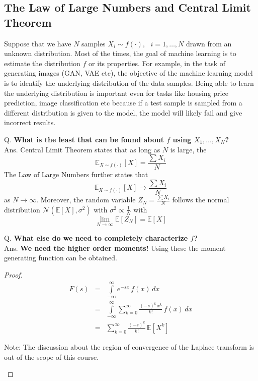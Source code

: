 \documentclass[11pt, twosides]{article}
\begin{document}
\subsection{The Law of Large Numbers and Central Limit Theorem}
Suppose that we have $N$ samples $X_i \sim f(\cdot), \:\:\: i = 1, \hdots, N$ drawn from an unknown distribution. Most of the times, the goal of machine learning is to estimate the distribution $f$ or its properties. For example, in the task of generating images (GAN, VAE etc), the objective of the machine learning model is to identify the underlying distribution of the data samples. Being able to learn the underlying distribution is important even for tasks like housing price prediction, image classification etc because if a test sample is sampled from a different distribution is given to the model, the model will likely fail and give incorrect results. 
\begin{flushleft}
Q. \textbf{What is the least that can be found about $f$ using $X_1, \hdots, X_N$?}\\

Ans. \color{blue} Central Limit Theorem states that as long as $N$ is large, the $$\mathbb{E}_{X \sim f(\cdot)}[X] = \frac{\sum X_i}{N}$$
The Law of Large Numbers further states that
$$\mathbb{E}_{X \sim f(\cdot)}[X] \xrightarrow{}\frac{\sum X_i}{N}$$
as $N \xrightarrow{} \infty$. Moreover, the random variable $Z_N = \frac{\sum X_i}{N}$ follows the normal distribution $\mathcal{N}(\mathbb{E}[X], \sigma^2)$
with $\sigma^2 \propto \frac{1}{N}$ with
$$\lim \limits_{N \xrightarrow{}\infty}\mathbb{E}[Z_N] = \mathbb{E}[X]$$
\end{flushleft}
\begin{flushleft}
Q. \textbf{What else do we need to completely characterize $f$?}\\

Ans. \color{blue} \textbf{We need the higher order moments!} Using these the moment generating function can be obtained.
\end{flushleft}


\begin{proof}
\begin{eqnarray*}
F(s) &=& \int \limits_{-\infty}^\infty e^{-sx}\, f(x)\, dx\\
&=& \int \limits_{-\infty}^\infty \sum \limits_{k = 0}^{\infty} \frac{(-s)^k\, x^k}{k!}\, f(x)\, dx\\
&=& \sum \limits_{k = 0}^{\infty} \frac{(-s)^k}{k!}\, \mathbb{E}[X^k]
\end{eqnarray*}
\begin{flushleft}
Note: The discussion about the region of convergence of the Laplace transform is out of the scope of this course.
\end{flushleft}
\end{proof}
\end{document}
